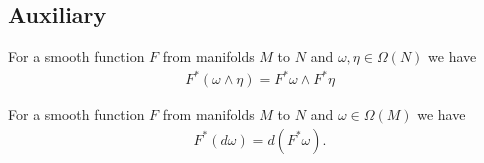 \begin{appendix}

\section{Auxiliary}



\begin{lemma}\cite{ybaehn}
For a smooth function $F$ from manifolds $M$ to $N$ and $\omega,\eta \in \Omega(N)$ we have
\begin{align*}
F^*(\omega \wedge \eta) = F^* \omega \wedge F^* \eta
\end{align*}
\end{lemma}

\begin{lemma}\cite{ybaehn}
For a smooth function $F$ from manifolds $M$ to $N$ and $\omega \in \Omega(M)$ we have
\begin{align*}
F^*(d\omega) = d(F^* \omega).
\end{align*}
\end{lemma}


\end{appendix}

\vspace{8cm}

%
\printbibliography

